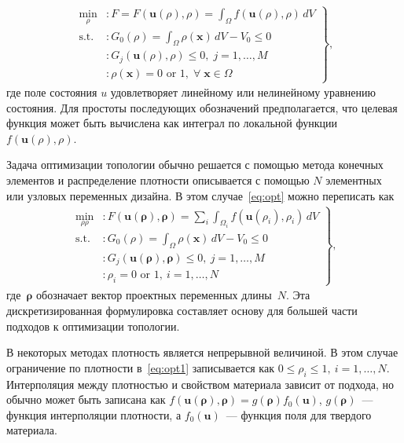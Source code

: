 \begin{equation}\label{eq:opt} 
	\begin{aligned}
	\left.
	\begin{array}{rl}
		\min\limits_{\rho} & : F = F(\mathbf{u}(\rho), \rho) = \int_{\Omega} f(\mathbf{u}(\rho), \rho) \, dV \\
		\text{s.t.} & : G_0(\rho) = \int_{\Omega} \rho(\mathbf{x}) \, dV - V_0 \leq 0 \\
		& : G_j(\mathbf{u}(\rho), \rho) \leq 0, \; j = 1, \ldots, M \\
		& : \rho(\mathbf{x}) = 0 \text{ or } 1, \; \forall \; \mathbf{x} \in \Omega
	\end{array} \right\},
	\end{aligned} 
\end{equation}
где поле состояния $u$ удовлетворяет линейному или нелинейному уравнению состояния.
Для простоты последующих обозначений предполагается, что целевая функция может быть вычислена как интеграл по локальной функции~$f(\mathbf{u}(\rho),\rho)$.

Задача оптимизации топологии обычно решается с помощью метода конечных элементов и распределение плотности описывается с помощью $N$ элементных или узловых переменных дизайна. В этом случае~\ref{eq:opt} можно переписать как
\begin{equation}\label{eq:opt1}
	\begin{aligned} 
	\left.
	\begin{array}{rl}
		\min\limits_{\rho\rho} & : F(\mathbf{u}(\boldsymbol{\rho}), \boldsymbol{\rho}) = \sum_{i} \int_{\Omega_{i}} f(\mathbf{u}(\rho_{i}), \rho_{i}) \, dV \\
		\text{s.t.} & : G_0(\rho) = \int_{\Omega} \rho(\mathbf{x}) \, dV - V_0 \leq 0 \\
		& : G_{j}(\mathbf{u}(\boldsymbol{\rho}), \boldsymbol{\rho}) \leq 0, \ j = 1, \ldots, M \\
		& : \rho_{i} = 0 \text{ or } 1, \ i = 1, \ldots, N
	\end{array} \right\},
\end{aligned} 
\end{equation}
где~$\boldsymbol{\rho}$ обозначает вектор проектных переменных длины~$N$. Эта дискретизированная формулировка составляет основу для большей части подходов к оптимизации топологии.

В некоторых методах плотность является непрерывной величиной. В этом случае ограничение по плотности в~\ref{eq:opt1} записывается как $0 \leq \rho_{i} \leq 1, \ i=1,\ldots,N$.
Интерполяция между плотностью и свойством материала зависит от подхода, но обычно может быть записана как $f(\mathbf{u}(\boldsymbol{\rho}),\boldsymbol{\rho}) = g(\boldsymbol{\rho})f_0(\mathbf{u})$,  $g(\boldsymbol{\rho})$~--- функция интерполяции плотности, а $f_0(\mathbf{u})$~--- функция поля для твердого материала.


